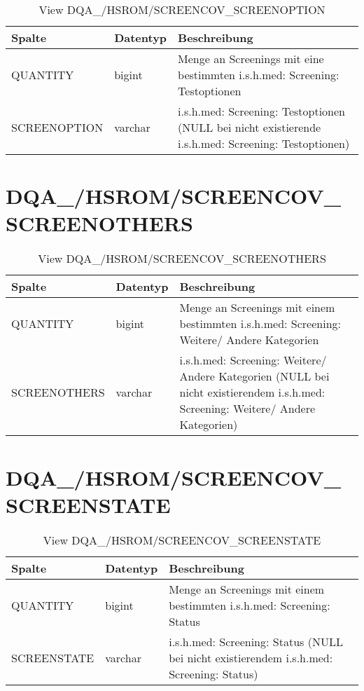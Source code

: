   \begin{table}[ht]
    \centering
    \caption{View DQA\_/HSROM/SCREENCOV\_SCREENOPTION}
    \label{tab:dqa/hsrom/screencovscreenoption}
    \begin{tabular}{||l|l|p{10cm}||}
      \hline
      Spalte & Datentyp & Beschreibung \\ [0.5ex] \hline \hline
      QUANTITY & bigint & Menge an Screenings mit eine bestimmten i.s.h.med: Screening: Testoptionen \\ \hline
      SCREENOPTION & varchar & i.s.h.med: Screening: Testoptionen (NULL bei nicht existierende i.s.h.med: Screening: Testoptionen)\\ \hline
    \end{tabular}
  \end{table}
 
  \section{DQA\_/HSROM/SCREENCOV\_\\ SCREENOTHERS}

  \begin{table}[ht]
    \centering
    \caption{View DQA\_/HSROM/SCREENCOV\_SCREENOTHERS}
    \label{tab:dqa/hsrom/screencovscreenothers}
    \begin{tabular}{||l|l|p{10cm}||}
      \hline
      Spalte & Datentyp & Beschreibung \\ [0.5ex] \hline \hline
      QUANTITY & bigint & Menge an Screenings mit einem bestimmten i.s.h.med: Screening: Weitere/ Andere Kategorien \\ \hline
      SCREENOTHERS & varchar & i.s.h.med: Screening: Weitere/ Andere Kategorien (NULL bei nicht existierendem i.s.h.med: Screening: Weitere/ Andere Kategorien)\\ \hline
    \end{tabular}
  \end{table}
 \clearpage
  \section{DQA\_/HSROM/SCREENCOV\_\\ SCREENSTATE}

  \begin{table}[ht]
    \centering
    \caption{View DQA\_/HSROM/SCREENCOV\_SCREENSTATE}
    \label{tab:dqa/hsrom/screencovscreenstate}
    \begin{tabular}{||l|l|p{10cm}||}
      \hline
      Spalte & Datentyp & Beschreibung \\ [0.5ex] \hline \hline
      QUANTITY & bigint & Menge an Screenings mit einem bestimmten i.s.h.med: Screening: Status \\ \hline
      SCREENSTATE & varchar & i.s.h.med: Screening: Status (NULL bei nicht existierendem i.s.h.med: Screening: Status)\\ \hline
    \end{tabular}
  \end{table}
 
